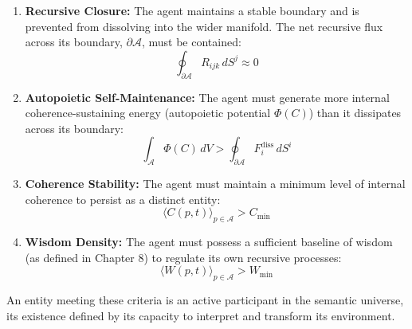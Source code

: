 \begin{enumerate}
    \item \textbf{Recursive Closure:} The agent maintains a stable boundary and is prevented from dissolving into the wider manifold. The net recursive flux across its boundary, \(\partial \mathcal{A}\), must be contained:
\begin{equation}
    \oint_{\partial \mathcal{A}} R_{ijk} \, dS^j \approx 0
\end{equation}

    \item \textbf{Autopoietic Self-Maintenance:} The agent must generate more internal coherence-sustaining energy (autopoietic potential \(\Phi(C)\)) than it dissipates across its boundary:
    \begin{equation}
    \int_{\mathcal{A}} \Phi(C) \, dV > \oint_{\partial \mathcal{A}} F_i^{\text{diss}} \, dS^i
    \end{equation}

    \item \textbf{Coherence Stability:} The agent must maintain a minimum level of internal coherence to persist as a distinct entity:
\begin{equation}
    \langle C(p,t) \rangle_{p \in \mathcal{A}} > C_{\text{min}}
\end{equation}

    \item \textbf{Wisdom Density:} The agent must possess a sufficient baseline of wisdom (as defined in Chapter 8) to regulate its own recursive processes:
    \begin{equation}
    \langle W(p,t) \rangle_{p \in \mathcal{A}} > W_{\text{min}}
    \end{equation}
\end{enumerate}

An entity meeting these criteria is an active participant in the semantic universe, its existence defined by its capacity to interpret and transform its environment.
